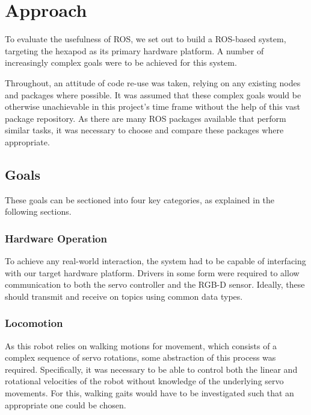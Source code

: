 \chapter{Approach}

To evaluate the usefulness of ROS, we set out to build a ROS-based system, targeting the hexapod as its primary hardware platform. A number of increasingly complex goals were to be achieved for this system.

Throughout, an attitude of code re-use was taken, relying on any existing nodes and packages where possible. It was assumed that these complex goals would be otherwise unachievable in this project's time frame without the help of this vast package repository. As there are many ROS packages available that perform similar tasks, it was necessary to choose and compare these packages where appropriate. 


\section{Goals}

These goals can be sectioned into four key categories, as explained in the following sections.

\subsection{Hardware Operation}

To achieve any real-world interaction, the system had to be capable of interfacing with our target hardware platform. Drivers in some form were required to allow communication to both the servo controller and the RGB-D sensor. Ideally, these should transmit and receive on topics using common data types.

\subsection{Locomotion}

As this robot relies on walking motions for movement, which consists of a complex sequence of servo rotations, some abstraction of this process was required. Specifically, it was necessary to be able to control both the linear and rotational velocities of the robot without knowledge of the underlying servo movements. For this, walking gaits would have to be investigated such that an appropriate one could be chosen.

